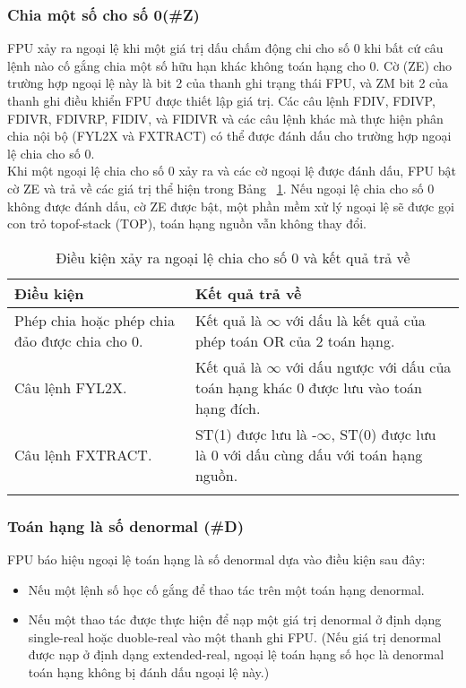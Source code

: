 	\subsubsection*{Chia một số cho số 0(\#Z)}
		FPU xảy ra ngoại lệ khi một giá trị dấu chấm động chi cho số 0 khi bất cứ câu lệnh nào cố gắng chia một số hữu hạn khác không toán hạng cho 0. Cờ (ZE) cho trường hợp ngoại lệ này là bit 2 của thanh ghi trạng thái FPU, và ZM  bit 2 của thanh ghi điều khiển FPU được thiết lập giá trị. Các câu lệnh FDIV, FDIVP, FDIVR, FDIVRP, FIDIV, và FIDIVR và các câu lệnh khác mà thực hiện phân chia nội bộ (FYL2X và FXTRACT) có thể được đánh dấu cho trường hợp ngoại lệ chia cho số 0. \\
		
		Khi một ngoại lệ chia cho số 0 xảy ra và các cờ ngoại lệ được đánh dấu, FPU bật cờ ZE và trả về các giá trị thể hiện trong Bảng ~\ref{tb:ChiaCho0}. Nếu ngoại lệ chia cho số 0 không được đánh dấu, cờ ZE được bật, một phần mềm xử lý ngoại lệ sẽ được gọi con trỏ topof-stack (TOP), toán hạng nguồn vẫn không thay đổi.
		\begin{longtable}{|m{6cm}|m{8cm}|}
				\hline
					Điều kiện & Kết quả trả về \\
				\hline
				\hline
					Phép chia hoặc phép chia đảo được chia cho 0. & Kết quả là $\mathbb{\infty}$ với dấu là kết quả của phép toán OR của 2 toán hạng. \\
				\hline
					Câu lệnh FYL2X. &  Kết quả là $\mathbb{\infty}$ với dấu ngược với dấu của toán hạng khác 0 được lưu vào toán hạng đích. \\
				\hline
					Câu lệnh FXTRACT. & ST(1) được lưu là -$\mathbb{\infty}$, ST(0) được lưu là 0 với dấu cùng dấu với toán hạng nguồn.\\
				\hline
					\caption{Điều kiện xảy ra ngoại lệ chia cho số 0 và kết quả trả về}					
					\label{tb:ChiaCho0}
		\end{longtable}		
		\newpage
		\subsubsection*{Toán hạng là số denormal (\#D)}
		FPU báo hiệu ngoại lệ toán hạng là số denormal dựa vào điều kiện sau đây:
			\begin{itemize}
			\renewcommand{\labelitemi}{\textbullet}
			\item Nếu một lệnh số học cố gắng để thao tác trên một toán hạng denormal.
			\item  Nếu một thao tác được thực hiện để nạp một giá trị denormal ở định dạng single-real hoặc duoble-real vào một thanh ghi FPU. (Nếu giá trị denormal được nạp ở định dạng extended-real, ngoại lệ toán hạng số học là denormal toán hạng không bị đánh dấu ngoại lệ này.)
			\end{itemize}
 	
